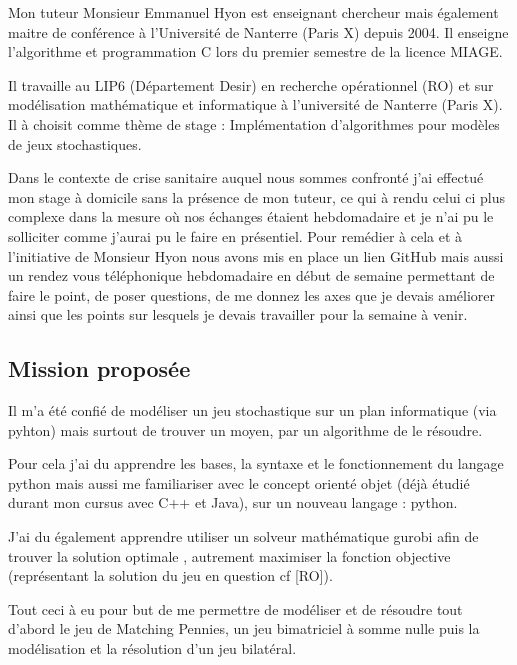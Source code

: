 \documentclass[a4paper, 12pt, twoside]{article}
\begin{document}
Mon tuteur Monsieur \textsf{Emmanuel Hyon} est enseignant chercheur mais également  maitre de conférence à l'Université de Nanterre (Paris X) depuis 2004. Il enseigne l'algorithme et programmation C lors du premier semestre de la licence MIAGE. \newline

Il travaille au LIP6 (Département Desir) en recherche opérationnel (RO) et sur modélisation mathématique et informatique à l'université de Nanterre (Paris X). Il à choisit comme thème de stage : \textsf{Implémentation d'algorithmes pour modèles de jeux stochastiques}. \newline

Dans le contexte de crise sanitaire auquel nous sommes confronté j'ai effectué mon stage à domicile sans la présence de mon tuteur, ce qui à rendu  celui ci plus complexe dans la mesure où nos échanges étaient hebdomadaire et je n'ai pu le solliciter comme j'aurai pu le faire en présentiel. Pour remédier à cela et à l'initiative de Monsieur \textsf{Hyon} nous avons mis en place un lien \textsf{GitHub} mais aussi un rendez vous téléphonique hebdomadaire en début de semaine permettant de faire le point, de poser questions, de me donnez les axes que je devais améliorer ainsi que les points sur lesquels je devais travailler pour la semaine à venir.  

\subsection{Mission proposée}
Il m'a été confié de modéliser un jeu stochastique sur un plan informatique (via \textsf{pyhton}) mais surtout de trouver un moyen, par un algorithme de le résoudre. \newline

Pour cela j'ai du apprendre les bases, la syntaxe et le fonctionnement du langage \textsf{python} mais aussi me familiariser avec le concept orienté objet (déjà étudié durant mon cursus avec \textsf{C++} et \textsf{Java}), sur un nouveau langage : \textsf{python}. \newline

J'ai du également apprendre utiliser un solveur mathématique \textsf{gurobi} afin de trouver la solution optimale , autrement maximiser la fonction objective (représentant la solution du jeu en question cf [RO]). \newline

Tout ceci à eu pour but de me permettre de modéliser et  de résoudre tout d'abord le jeu de \textsf{Matching Pennies}, un jeu bimatriciel à somme nulle puis la modélisation et la résolution d'un jeu bilatéral. \newline
\end{document}

